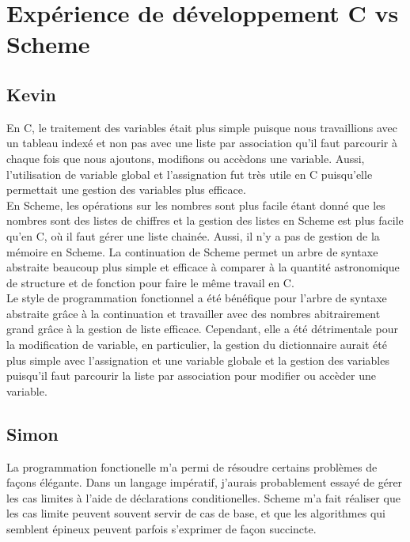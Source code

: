 \documentclass[a4paper,12pt,french]{article}
\begin{document}
	\section{Expérience de développement C vs Scheme}
	\subsection{Kevin}
	En C, le traitement des variables était plus simple puisque nous travaillions avec un tableau indexé et non pas avec une liste par association qu'il faut parcourir à chaque fois que nous ajoutons, modifions ou accèdons une variable. Aussi, l'utilisation de variable global et l'assignation fut très utile en C puisqu'elle permettait une gestion des variables plus efficace.\\
	
	En Scheme, les opérations sur les nombres sont plus facile étant donné que les nombres sont des listes de chiffres et la gestion des listes en Scheme est plus facile qu'en C, où il faut gérer une liste chainée. Aussi, il n'y a pas de gestion de la mémoire en Scheme. La continuation de Scheme permet un arbre de syntaxe abstraite beaucoup plus simple et efficace à comparer à la quantité astronomique de structure et de fonction pour faire le même travail en C.\\
	
	Le style de programmation fonctionnel a été bénéfique pour l'arbre de syntaxe abstraite grâce à la continuation et travailler avec des nombres abitrairement grand grâce à la gestion de liste efficace. Cependant, elle a été détrimentale pour la modification de variable, en particulier, la gestion du dictionnaire aurait été plus simple avec l'assignation et une variable globale et la gestion des variables puisqu'il faut parcourir la liste par association pour modifier ou accèder une variable.\\
        \subsection{Simon}
        La programmation fonctionelle m'a permi de résoudre certains problèmes de façons élégante. Dans un langage impératif, j'aurais probablement essayé de gérer les cas limites à l'aide de déclarations conditionelles. Scheme m'a fait réaliser que les cas limite peuvent souvent servir de cas de base, et que les algorithmes qui semblent épineux peuvent parfois s'exprimer de façon succincte.\\
\end{document}
